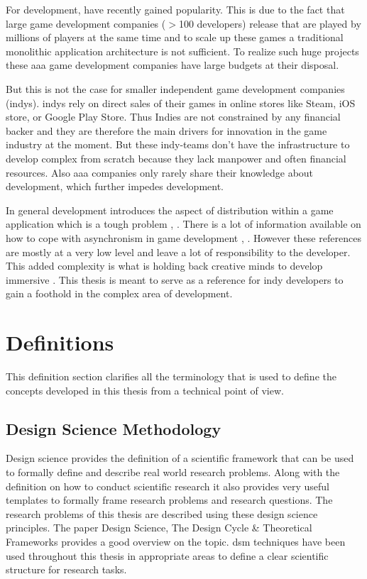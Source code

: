 For \og{} development, \mss{} have recently gained popularity. This is due to
the fact that large game development companies ($>$100 developers) release
\ogs{} that are played by millions of players at the same time
\cite{pronschinske2015turbine} and to scale up these games a traditional
monolithic application architecture is not sufficient. To realize such huge
\og{} projects these \gls{aaa} game development companies have large budgets at
their disposal.

But this is not the case for smaller independent game development companies
(\glspl{indy}). \Glspl{indy} rely on direct sales of their games in online
stores like Steam, iOS store, or Google Play Store. Thus Indies are not
constrained by any financial backer and they are therefore the main drivers for
innovation in the game industry at the moment. But these indy-teams don't have
the infrastructure to develop complex \ogs{} from scratch because they lack
manpower and often financial resources. Also \gls{aaa} companies only rarely
share their knowledge about \og{} development, which further impedes \og{}
development.

In general \og{} development introduces the aspect of distribution within a game
application which is a tough problem \cite{pneuli1990distributed},
\cite{kupermann2001synthesizing}. There is a lot of information available on how
to cope with asynchronism in game development \cite{gambetta_fast_paced},
\cite{gafferon2017games}. However these references are mostly at a very low
level and leave a lot of responsibility to the developer. This added complexity
is what is holding back creative minds to develop immersive \ogs{}. This thesis
is meant to serve as a reference for \gls{indy} developers to gain a foothold in
the complex area of \og{} development.

\section{Definitions}

This definition section clarifies all the terminology that is used to define the
concepts developed in this thesis from a technical point of view.

\subsection{Design Science Methodology}
\label{sub:dsm}

Design science provides the definition of a scientific framework that can be
used to formally define and describe real world research problems. Along with
the definition on how to conduct scientific research it also provides very
useful templates to formally frame research problems and research questions. The
research problems of this thesis are described using these design science
principles. The paper Design Science, The Design Cycle \& Theoretical Frameworks
\cite{biedermann2016design_science} provides a good overview on the topic.
\gls{dsm} techniques have been used throughout this thesis in appropriate areas
to define a clear scientific structure for research tasks.

